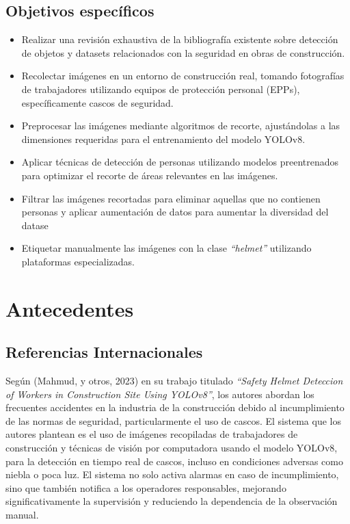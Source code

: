 \subsection{Objetivos específicos}

\begin{itemize}
  \item Realizar una revisión exhaustiva de la bibliografía existente sobre detección de objetos y datasets relacionados con la seguridad en obras de construcción.
  \item Recolectar imágenes en un entorno de construcción real, tomando fotografías de trabajadores utilizando equipos de protección personal (EPPs), específicamente cascos de seguridad.
  \item Preprocesar las imágenes mediante algoritmos de recorte, ajustándolas a las dimensiones requeridas para el entrenamiento del modelo YOLOv8.
  \item Aplicar técnicas de detección de personas utilizando modelos preentrenados para optimizar el recorte de áreas relevantes en las imágenes.
  \item Filtrar las imágenes recortadas para eliminar aquellas que no contienen personas y aplicar aumentación de datos para aumentar la diversidad del datase
  \item Etiquetar manualmente las imágenes con la clase \textit{``helmet''} utilizando plataformas especializadas.
\end{itemize}

\section{Antecedentes}

\subsection{Referencias Internacionales}

Según (Mahmud, y otros, 2023) \cite{mahmud2023safety} en su trabajo titulado \textit{``Safety Helmet Deteccion of Workers in Construction Site Using YOLOv8''}, los autores abordan los frecuentes accidentes en la industria de la construcción debido al incumplimiento de las normas de seguridad, particularmente el uso de cascos. El sistema que los autores plantean es el uso de imágenes recopiladas de trabajadores de construcción y técnicas de visión por computadora usando el modelo YOLOv8, para la detección en tiempo real de cascos, incluso en condiciones adversas como niebla o poca luz. El sistema no solo activa alarmas en caso de incumplimiento, sino que también notifica a los operadores responsables, mejorando significativamente la supervisión y reduciendo la dependencia de la observación
manual.

